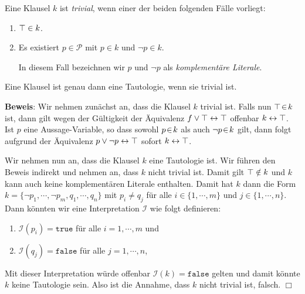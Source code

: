 \begin{Definition}
  Eine Klausel $k$ ist \emph{\color{blue}trivial}, wenn einer der beiden folgenden F\"{a}lle vorliegt:
  \begin{enumerate}
  \item $\top \in k$.
  \item Es existiert $p \in \mathcal{P}$ mit $p \in k$ und $\neg p \in k$.

        In diesem Fall bezeichnen wir $p$ und $\neg p$ als \emph{\color{blue}komplement\"{a}re Literale}.
        \eox
\end{enumerate}
\end{Definition}

\begin{Satz} \label{satz:trivial}
  Eine Klausel ist genau dann eine Tautologie, wenn sie trivial ist.
\end{Satz}
\textbf{Beweis}:  Wir nehmen zun\"{a}chst an, dass die Klausel $k$ trivial ist.
Falls nun $\top \!\in\! k$ ist, dann gilt wegen der G\"{u}ltigkeit der \"{A}quivalenz 
$f \vee \top \leftrightarrow \top$
offenbar $k \leftrightarrow \top$.   Ist $p$ eine Aussage-Variable, so dass
sowohl $p \!\in\! k$ als auch $\neg p \!\in\! k$ gilt, dann folgt aufgrund der \"{A}quivalenz $p \vee
\neg p \leftrightarrow \top$ sofort $k \leftrightarrow \top$.

Wir nehmen nun an, dass die Klausel $k$ eine Tautologie ist.  Wir f\"{u}hren den Beweis
indirekt und nehmen an, dass $k$ nicht trivial ist.  Damit gilt  $\top \notin k$ und
$k$ kann auch keine komplement\"{a}ren Literale enthalten.  Damit hat $k$ dann die Form
\\[0.2cm]
\hspace*{1.3cm} 
$k = \{ \neg p_1, \cdots, \neg p_m, q_1, \cdots, q_n \}$ \quad mit $p_i
\not= q_j$ f\"{u}r alle $i \in \{ 1,\cdots,m\}$ und $j \in \{1, \cdots, n\}$.
\\[0.2cm]
Dann k\"{o}nnten wir eine Interpretation $\mathcal{I}$ wie folgt definieren:
\begin{enumerate}
\item $\mathcal{I}(p_i) = \texttt{true}$ f\"{u}r alle $i = 1, \cdots, m$ und
\item $\mathcal{I}(q_j) = \texttt{false}$ f\"{u}r alle $j = 1, \cdots, n$,
\end{enumerate}
Mit dieser Interpretation w\"{u}rde offenbar $\mathcal{I}(k) = \texttt{false}$ gelten und damit k\"{o}nnte $k$ keine
Tautologie sein.  Also ist die Annahme, dass $k$ nicht trivial ist, falsch.
\hspace*{\fill}  $\Box$

